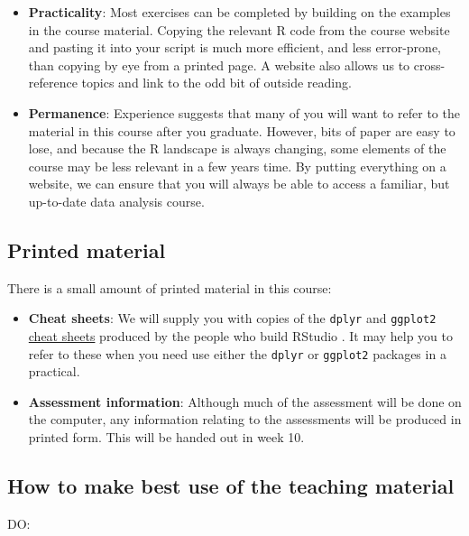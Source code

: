 \documentclass[]{book}
\begin{document}
\begin{itemize}
\item
  \textbf{Practicality}: Most exercises can be completed by building on
  the examples in the course material. Copying the relevant R code from
  the course website and pasting it into your script is much more
  efficient, and less error-prone, than copying by eye from a printed
  page. A website also allows us to cross-reference topics and link to
  the odd bit of outside reading.
\item
  \textbf{Permanence}: Experience suggests that many of you will want to
  refer to the material in this course after you graduate. However, bits
  of paper are easy to lose, and because the R landscape is always
  changing, some elements of the course may be less relevant in a few
  years time. By putting everything on a website, we can ensure that you
  will always be able to access a familiar, but up-to-date data analysis
  course.
\end{itemize}

\subsection{Printed material}\label{printed-material}

There is a small amount of printed material in this course:

\begin{itemize}
\item
  \textbf{Cheat sheets}: We will supply you with copies of the
  \texttt{dplyr} and \texttt{ggplot2}
  \href{https://www.rstudio.com/resources/cheatsheets/}{cheat sheets}
  produced by the people who build RStudio . It may help you to refer to
  these when you need use either the \texttt{dplyr} or \texttt{ggplot2}
  packages in a practical.
\item
  \textbf{Assessment information}: Although much of the assessment will
  be done on the computer, any information relating to the assessments
  will be produced in printed form. This will be handed out in week 10.
\end{itemize}

\subsection{How to make best use of the teaching
material}\label{how-to-make-best-use-of-it}

DO:
\end{document}
